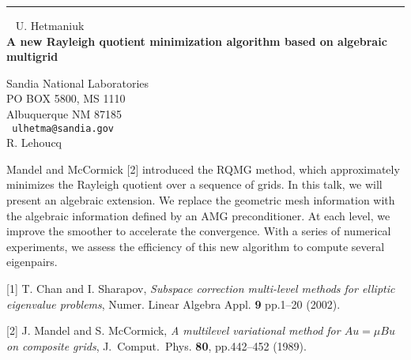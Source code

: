 \documentclass{report}
\begin{document}
\begin{center}

\rule{6in}{1pt} \
{\large
U. Hetmaniuk
\\ {\bf
A new Rayleigh quotient minimization algorithm based on algebraic
multigrid
}}

Sandia National Laboratories
\\
PO BOX 5800, MS 1110
\\
Albuquerque NM 87185
\\ {\tt
ulhetma@sandia.gov
}
\\
R. Lehoucq
\end{center}

Mandel and McCormick [2] introduced the RQMG method, which
approximately minimizes the Rayleigh quotient over a sequence of grids.
In this talk, we will present an algebraic extension. We replace the
geometric mesh information with the algebraic information defined by an
AMG preconditioner. At each level, we improve the smoother to
accelerate the convergence. With a series of numerical experiments, we
assess the efficiency of this new algorithm to compute several
eigenpairs. 

[1] T. Chan and I. Sharapov, {\em Subspace correction multi-level methods
for elliptic eigenvalue problems}, Numer. Linear Algebra Appl. {\bf 9}
pp.1--20 (2002).

[2] J. Mandel and S. McCormick,
{\em A multilevel variational method for $Au=\mu Bu$
on composite grids}, J.~Comput.~Phys. {\bf 80},
pp.442--452 (1989). 
\end{document}
